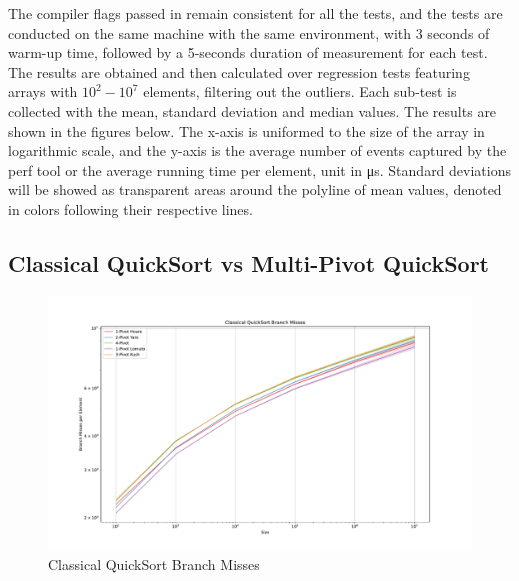 \documentclass[a4paper,oneside,12pt]{book}
\begin{document}
The compiler flags passed in remain consistent for all the tests, and the tests are conducted on the same machine with the same environment,
with 3 seconds of warm-up time, followed by a 5-seconds duration of measurement for each test. The results are obtained and then calculated over regression tests featuring arrays with $10^2 - 10^7$ elements,
filtering out the outliers. Each sub-test is collected with the mean, standard deviation and median values. The results are shown in the figures below.
The x-axis is uniformed to the size of the array in logarithmic scale, and the y-axis is the average number of events captured by the perf tool or the average running time per element, unit in μs.
Standard deviations will be showed as transparent areas around the polyline of mean values, denoted in colors following their respective lines.
\subsection{Classical QuickSort vs Multi-Pivot QuickSort}

\begin{center}
\begin{figure}[H]
    \hypertarget{fig:classicalbranchmiss}{}
    \caption{Classical QuickSort Branch Misses}
    \centering
    \hspace*{-0.27\textwidth}
    \includegraphics[width=1.5\textwidth]{Classical QuickSort Branch Misses.pdf}
\end{figure}
\end{center}
\end{document}
